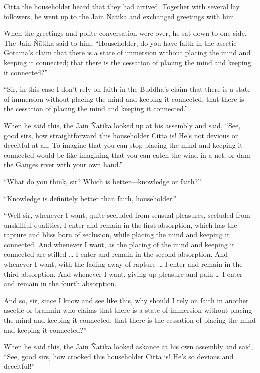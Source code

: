 \documentclass[12pt,openany]{book}%
\begin{document}
Citta the householder heard that they had arrived. Together with several lay followers, he went up to the Jain \textsanskrit{Ñātika} and exchanged greetings with him. 

When the greetings and polite conversation were over, he sat down to one side. The Jain \textsanskrit{Ñātika} said to him, “Householder, do you have faith in the ascetic Gotama’s claim that there is a state of immersion without placing the mind and keeping it connected; that there is the cessation of placing the mind and keeping it connected?” 

“Sir, in this case I don’t rely on faith in the Buddha’s claim that there is a state of immersion without placing the mind and keeping it connected; that there is the cessation of placing the mind and keeping it connected.” 

When he said this, the Jain \textsanskrit{Ñātika} looked up at his assembly and said, “See, good sirs, how straightforward this householder Citta is! He’s not devious or deceitful at all. To imagine that you can stop placing the mind and keeping it connected would be like imagining that you can catch the wind in a net, or dam the Ganges river with your own hand.” 

“What do you think, sir? Which is better—knowledge or faith?” 

“Knowledge is definitely better than faith, householder.” 

“Well sir, whenever I want, quite secluded from sensual pleasures, secluded from unskillful qualities, I enter and remain in the first absorption, which has the rapture and bliss born of seclusion, while placing the mind and keeping it connected. And whenever I want, as the placing of the mind and keeping it connected are stilled … I enter and remain in the second absorption. And whenever I want, with the fading away of rapture … I enter and remain in the third absorption. And whenever I want, giving up pleasure and pain … I enter and remain in the fourth absorption. 

And so, sir, since I know and see like this, why should I rely on faith in another ascetic or brahmin who claims that there is a state of immersion without placing the mind and keeping it connected; that there is the cessation of placing the mind and keeping it connected?” 

When he said this, the Jain \textsanskrit{Ñātika} looked askance at his own assembly and said, “See, good sirs, how crooked this householder Citta is! He’s so devious and deceitful!” 
\end{document}
